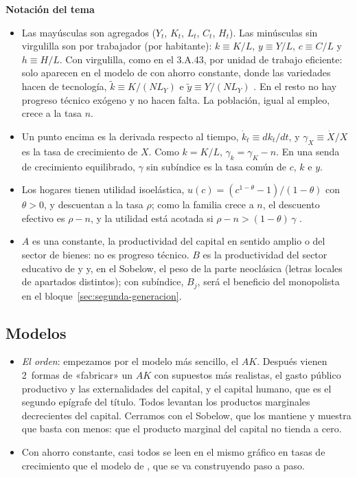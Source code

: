 \documentclass[11pt]{article}
\begin{document}
\begin{anotaciones}
\textbf{Notación del tema}
\begin{itemize}
\item Las mayúsculas son agregados ($Y_t$, $K_t$, $L_t$, $C_t$, $H_t$). Las minúsculas sin virgulilla son por trabajador (por habitante): $k\equiv K/L$, $y\equiv Y/L$, $c\equiv C/L$ y $h\equiv H/L$. Con virgulilla, como en el 3.A.43, por unidad de trabajo eficiente: solo aparecen en el modelo de  con ahorro constante, donde las variedades hacen de tecnología, $\tilde k\equiv K/(NL_Y)$ e $\tilde y\equiv Y/(NL_Y)$ . En el resto no hay progreso técnico exógeno y no hacen falta. La población, igual al empleo, crece a la tasa $n$.
\item Un punto encima es la derivada respecto al tiempo, $\dot k_t\equiv dk_t/dt$, y $\gamma_X\equiv\dot X/X$ es la tasa de crecimiento de $X$. Como $k=K/L$, $\gamma_k=\gamma_K-n$. En una senda de crecimiento equilibrado, $\gamma$ sin subíndice es la tasa común de $c$, $k$ e $y$.
\item Los hogares tienen utilidad isoelástica, $u(c)=(c^{1-\theta}-1)/(1-\theta)$ con $\theta>0$, y descuentan a la tasa $\rho$; como la familia crece a $n$, el descuento efectivo es $\rho-n$, y la utilidad está acotada si $\rho-n>(1-\theta)\,\gamma$ .
\item $A$ es una constante, la productividad del capital en sentido amplio o del sector de bienes: no es progreso técnico. $B$ es la productividad del sector educativo de  y  y, en el Sobelow, el peso de la parte neoclásica (letras locales de apartados distintos); con subíndice, $B_j$, será el beneficio del monopolista en el bloque~\ref{sec:segunda-generacion}.
\end{itemize}
\end{anotaciones}

\subsection{Modelos}\label{sec:pg-modelos}

\begin{itemize}
\item \emph{El orden}: empezamos por el modelo más sencillo, el $AK$. Después vienen 2~formas de «fabricar» un $AK$ con supuestos más realistas, el gasto público productivo y las externalidades del capital, y el capital humano, que es el segundo epígrafe del título. Todos levantan los productos marginales decrecientes del capital. Cerramos con el Sobelow, que los mantiene y muestra que basta con menos: que el producto marginal del capital no tienda a cero.
\item Con ahorro constante, casi todos se leen en el mismo gráfico en tasas de crecimiento que el modelo de , que se va construyendo paso a paso.
\end{itemize}
\end{document}
